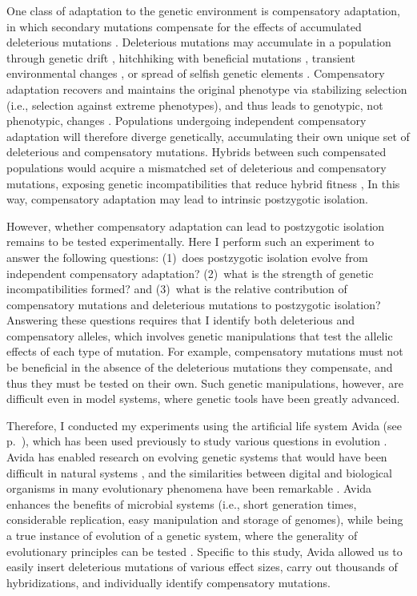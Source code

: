 \begin{doublespace}
One class of adaptation to the genetic environment
is compensatory adaptation, in which secondary mutations
compensate for the effects of accumulated deleterious mutations
\citep{har96,bur99,moo00,lev00,mai02,est03,est11}.
%
Deleterious mutations may accumulate in a population
through genetic drift \citep{lan94,lyn95},
hitchhiking with beneficial mutations \citep{chu11},
transient environmental changes \citep{bjo00},
or spread of selfish genetic elements \citep{pre10}.
%
Compensatory adaptation recovers and maintains the original phenotype
via stabilizing selection (i.e., selection against extreme phenotypes),
and thus leads to genotypic, not phenotypic, changes \citep{har96}.
%
Populations undergoing independent compensatory adaptation
will therefore diverge genetically, accumulating their own unique set
of deleterious and compensatory mutations.
%
Hybrids between such compensated populations would acquire
a mismatched set of deleterious and compensatory mutations,
exposing genetic incompatibilities that reduce hybrid fitness
\citep{har96,orr01,kon02,kul04,lan07,sch09b,pre10},
%
In this way, compensatory adaptation may lead to
intrinsic postzygotic isolation.



However, whether compensatory adaptation can lead to postzygotic isolation
remains to be tested experimentally.
%
Here I perform such an experiment to answer the following questions:
(1)~does postzygotic isolation evolve from independent compensatory adaptation?
(2)~what is the strength of genetic incompatibilities formed?
and (3)~what is the relative contribution of compensatory mutations
and deleterious mutations to postzygotic isolation?
%
Answering these questions requires that I identify
both deleterious and compensatory alleles,
which involves genetic manipulations that test the allelic
effects of each type of mutation.
%
For example, compensatory mutations must not be beneficial
in the absence of the deleterious mutations they compensate,
and thus they must be tested on their own.
%
Such genetic manipulations, however, are difficult even in
model systems, where genetic tools have been greatly advanced.



Therefore, I conducted my experiments using the artificial life system
Avida \citep{ofr04} (see p.~\pageref{sec:avida}),
which has been used previously to study various questions
in evolution \citep{len99,len03,cho04,mis06,ele07,ele08,mis10}.
%
Avida has enabled research on evolving genetic systems
that would have been difficult in natural systems \citep{ada06},
and the similarities between digital and biological organisms
in many evolutionary phenomena have been remarkable \citep{wil02,ada06}.
%
Avida enhances the benefits of microbial systems
(i.e., short generation times, considerable replication,
easy manipulation and storage of genomes),
while being a true instance of evolution of a genetic system,
where the generality of evolutionary principles can be tested
\citep{len99,ele08,mis06}.
%
Specific to this study, Avida allowed us to easily insert deleterious mutations
of various effect sizes, carry out thousands of hybridizations,
and individually identify compensatory mutations.




\end{doublespace}
